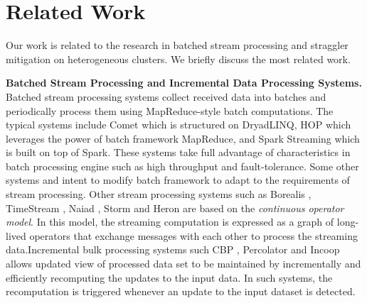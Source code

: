 \section{Related Work}

  Our work is related to the research in batched stream processing and straggler mitigation on heterogeneous clusters. We briefly discuss the most related work.

  \textbf{Batched Stream Processing and Incremental Data Processing Systems.} Batched stream processing systems collect received data into batches and periodically process them using MapReduce-style batch computations. The typical systems include Comet \cite{He2010} which is structured on DryadLINQ, HOP \cite{Condie2010} which leverages the power of batch framework MapReduce, and Spark Streaming \cite{Zaharia2013} which is built on top of Spark. These systems take full advantage of characteristics in batch processing engine such as high throughput and fault-tolerance. Some other systems \cite{Li2011} and \cite{Lam2012} intent to modify batch framework to adapt to the requirements of stream processing. Other stream processing systems such as Borealis \cite{Abadi2005}, TimeStream \cite{Qian2013}, Naiad \cite{Murray2013}, Storm \cite{Toshniwal2014} and Heron \cite{Kulkarni2015} are based on the \emph{continuous operator model}. In this model, the streaming computation is expressed as a graph of long-lived operators that exchange messages with each other to process the streaming data.Incremental bulk processing systems such CBP \cite{Logothetis2010}, Percolator \cite{Peng2010} and Incoop \cite{Bhatotia2011a} allows updated view of processed data set to be maintained by incrementally and efficiently recomputing the updates to the input data. In such systems, the recomputation is triggered whenever an update to the input dataset is detected.

